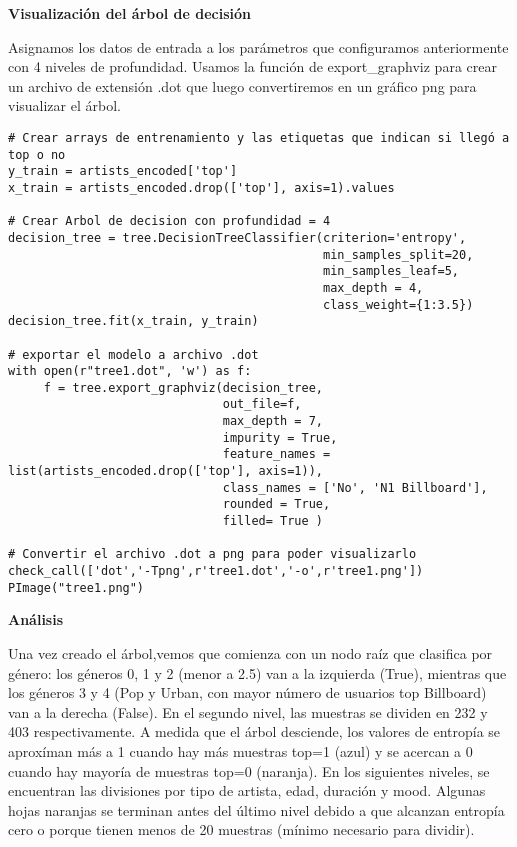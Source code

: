 \documentclass{article}
\begin{document}
\textbf{Visualización del árbol de decisión}





Asignamos los datos de entrada a los parámetros que configuramos anteriormente con 4 niveles de profundidad. Usamos la función de export\_graphviz para crear un archivo de extensión .dot que luego convertiremos en un gráfico png para visualizar el árbol.

\begin{lstlisting}
# Crear arrays de entrenamiento y las etiquetas que indican si llegó a top o no 
y_train = artists_encoded['top']
x_train = artists_encoded.drop(['top'], axis=1).values 

# Crear Arbol de decision con profundidad = 4
decision_tree = tree.DecisionTreeClassifier(criterion='entropy',
                                            min_samples_split=20,
                                            min_samples_leaf=5,
                                            max_depth = 4,
                                            class_weight={1:3.5})
decision_tree.fit(x_train, y_train)

# exportar el modelo a archivo .dot
with open(r"tree1.dot", 'w') as f:
     f = tree.export_graphviz(decision_tree,
                              out_file=f,
                              max_depth = 7,
                              impurity = True,
                              feature_names = list(artists_encoded.drop(['top'], axis=1)),
                              class_names = ['No', 'N1 Billboard'],
                              rounded = True,
                              filled= True )
        
# Convertir el archivo .dot a png para poder visualizarlo
check_call(['dot','-Tpng',r'tree1.dot','-o',r'tree1.png'])
PImage("tree1.png")
\end{lstlisting}







\textbf{Análisis}





Una vez creado el árbol,vemos que comienza con un nodo raíz que clasifica por género: los géneros 0, 1 y 2 (menor a 2.5) van a la izquierda (True), mientras que los géneros 3 y 4 (Pop y Urban, con mayor número de usuarios top Billboard) van a la derecha (False). En el segundo nivel, las muestras se dividen en 232 y 403 respectivamente.
A medida que el árbol desciende, los valores de entropía se aproxíman más a 1 cuando hay más muestras top=1 (azul) y se acercan a 0 cuando hay mayoría de muestras top=0 (naranja). En los siguientes niveles, se encuentran las divisiones por tipo de artista, edad, duración y mood. Algunas hojas naranjas se terminan antes del último nivel debido a que alcanzan entropía cero o porque tienen menos de 20 muestras (mínimo necesario para dividir).
\end{document}
